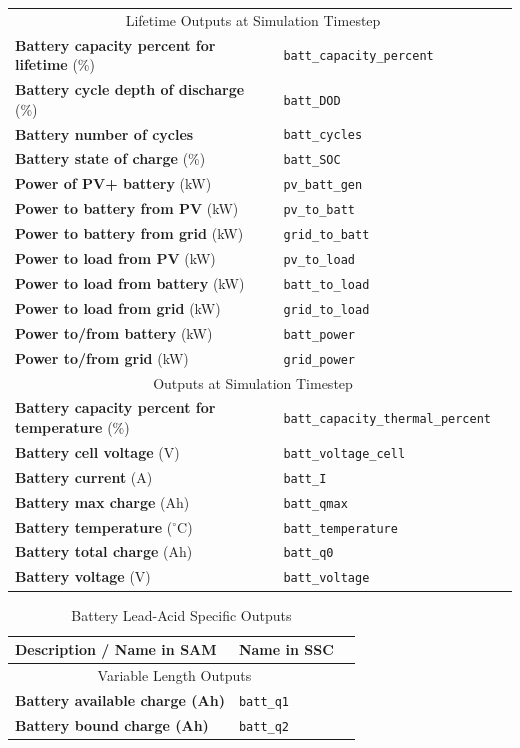 \documentclass[12pt,letterpaper]{article}
\begin{document}
\begin{table}
\begin{center}
\begin{tabular}{lll}
\midrule
\multicolumn{2}{c}{Lifetime Outputs at Simulation Timestep}\\
\textbf{Battery capacity percent for lifetime} (\%) & \texttt{batt\_capacity\_percent} \\
\textbf{Battery cycle depth of discharge} (\%) & \texttt{batt\_DOD} \\
\textbf{Battery number of cycles} & \texttt{batt\_cycles} \\
\textbf{Battery state of charge} (\%) & \texttt{batt\_SOC} \\
\textbf{Power of PV+ battery} (kW) & \texttt{pv\_batt\_gen} \\
\textbf{Power to battery from PV} (kW) & \texttt{pv\_to\_batt} \\
\textbf{Power to battery from grid}  (kW)& \texttt{grid\_to\_batt} \\
\textbf{Power to load from PV} (kW) & \texttt{pv\_to\_load} \\
\textbf{Power to load from battery} (kW) & \texttt{batt\_to\_load} \\
\textbf{Power to load from grid} (kW) & \texttt{grid\_to\_load} \\
\textbf{Power to/from battery} (kW) & \texttt{batt\_power} \\
\textbf{Power to/from grid} (kW) & \texttt{grid\_power} \\
\midrule
\multicolumn{2}{c}{Outputs at Simulation Timestep}\\
\textbf{Battery capacity percent for temperature} (\%) & \texttt{batt\_capacity\_thermal\_percent} \\
\textbf{Battery cell voltage} (V)& \texttt{batt\_voltage\_cell} \\
\textbf{Battery current} (A) & \texttt{batt\_I} \\
\textbf{Battery max charge} (Ah) & \texttt{batt\_qmax} \\
\textbf{Battery temperature} ($^\circ$C) & \texttt{batt\_temperature} \\
\textbf{Battery total charge} (Ah) & \texttt{batt\_q0} \\
\textbf{Battery voltage} (V) & \texttt{batt\_voltage} \\
\hline
\end{tabular}
\label{tab-batteryoutputs}
\end{center}
\end{table}

\begin{table}
\begin{center}
\caption{Battery Lead-Acid Specific Outputs}
\begin{tabular}{lll}
\midrule
Description / \textbf{Name in SAM} & Name in SSC \\
\midrule
\multicolumn{2}{c}{Variable Length Outputs}\\
\textbf{Battery available charge (Ah)} & \texttt{batt\_q1} \\
\textbf{Battery bound charge (Ah)} & \texttt{batt\_q2} \\
\hline
\end{tabular}
\label{tab-batteryoutputs-lead}
\end{center}
\end{table}
\end{document}
